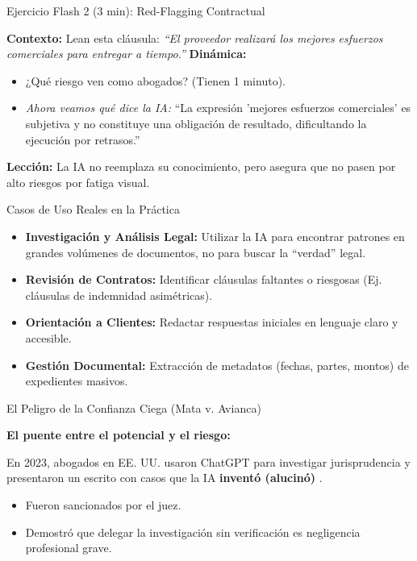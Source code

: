 \documentclass[aspectratio=169]{beamer}
\begin{document}
\begin{frame}{Ejercicio Flash 2 (3 min): Red-Flagging Contractual}


\textbf{Contexto:} Lean esta cláusula: \textit{``El proveedor realizará los mejores esfuerzos comerciales para entregar a tiempo.''}
\textbf{Dinámica:}
\begin{itemize}
  \item ¿Qué riesgo ven como abogados? (Tienen 1 minuto).
  \item \textit{Ahora veamos qué dice la IA:} ``La expresión 'mejores esfuerzos comerciales' es subjetiva y no constituye una obligación de resultado, dificultando la ejecución por retrasos.''
\end{itemize}
\textbf{Lección:} La IA no reemplaza su conocimiento, pero asegura que no pasen por alto riesgos por fatiga visual.

\end{frame}

\begin{frame}{Casos de Uso Reales en la Práctica}


\begin{itemize}
  \item \textbf{Investigación y Análisis Legal:} Utilizar la IA para encontrar patrones en grandes volúmenes de documentos, no para buscar la ``verdad'' legal.
  \item \textbf{Revisión de Contratos:} Identificar cláusulas faltantes o riesgosas (Ej. cláusulas de indemnidad asimétricas).
  \item \textbf{Orientación a Clientes:} Redactar respuestas iniciales en lenguaje claro y accesible.
  \item \textbf{Gestión Documental:} Extracción de metadatos (fechas, partes, montos) de expedientes masivos.
\end{itemize}
\end{frame}

\begin{frame}{El Peligro de la Confianza Ciega (Mata v. Avianca)}


\textbf{El puente entre el potencial y el riesgo:}

En 2023, abogados en EE. UU. usaron ChatGPT para investigar jurisprudencia y presentaron un escrito con casos que la IA \textbf{inventó (alucinó)} \cite{matavavianca}.

\begin{itemize}
  \item Fueron sancionados por el juez.
  \item Demostró que delegar la investigación sin verificación es negligencia profesional grave.
\end{itemize}
\end{frame}
\end{document}
